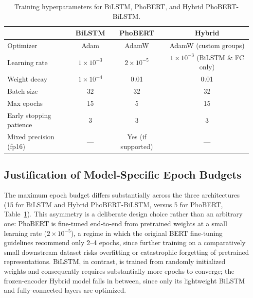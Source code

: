 \documentclass[12pt]{report} %
\begin{document}
\begin{table}[htbp]
    \centering
    \caption{Training hyperparameters for BiLSTM, PhoBERT, and Hybrid PhoBERT-BiLSTM.}
    \label{tab:training-hyperparams}
    \begin{tabular}{lccc}
        \hline
                                & \textbf{BiLSTM}  & \textbf{PhoBERT}   & \textbf{Hybrid}                      \\
        \hline
        Optimizer               & Adam             & AdamW              & AdamW (custom groups)                \\
        Learning rate           & $1\times10^{-3}$ & $2\times10^{-5}$   & $1\times10^{-3}$ (BiLSTM \& FC only) \\
        Weight decay            & $1\times10^{-4}$ & 0.01               & 0.01                                 \\
        Batch size              & 32               & 32                 & 32                                   \\
        Max epochs              & 15               & 5                  & 15                                   \\
        Early stopping patience & 3                & 3                  & 3                                    \\
        Mixed precision (fp16)  & ---              & Yes (if supported) & ---                                  \\
        \hline
    \end{tabular}
\end{table}

\subsection{Justification of Model-Specific Epoch Budgets}
\label{subsec:epoch-justification}
The maximum epoch budget differs substantially across the three architectures (15 for BiLSTM and Hybrid PhoBERT-BiLSTM, versus 5 for PhoBERT, Table~\ref{tab:training-hyperparams}). This asymmetry is a deliberate design choice rather than an arbitrary one: PhoBERT is fine-tuned end-to-end from pretrained weights at a small learning rate ($2\times10^{-5}$), a regime in which the original BERT fine-tuning guidelines \cite{devlin2019bertpretrainingdeepbidirectional} recommend only 2--4 epochs, since further training on a comparatively small downstream dataset risks overfitting or catastrophic forgetting of pretrained representations. BiLSTM, in contrast, is trained from randomly initialized weights and consequently requires substantially more epochs to converge; the frozen-encoder Hybrid model falls in between, since only its lightweight BiLSTM and fully-connected layers are optimized.
\end{document}
